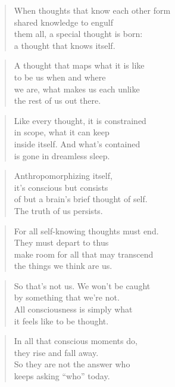 \documentclass[10pt,a4paper]{article}
\begin{document}
\begin{paracol}{2}
\begin{verse}
When thoughts that know each other form\\
shared knowledge to engulf\\
them all, a special thought is born:\\
a thought that knows itself.
\end{verse}

\begin{verse}
A thought that maps what it is like\\
to be us when and where\\
we are, what makes us each unlike\\
the rest of us out there.
\end{verse}

\begin{verse}
Like every thought, it is constrained\\
in scope, what it can keep\\
inside itself. And what’s contained\\
is gone in dreamless sleep.
\end{verse}

\begin{verse}
Anthropomorphizing itself,\\
it’s conscious but consists\\
of but a brain’s brief thought of self.\\
The truth of us persists.
\end{verse}

\begin{verse}
For all self-knowing thoughts must end.\\
They must depart to thus\\
make room for all that may transcend\\
the things we think are us.
\end{verse}

\begin{verse}
So that’s not us. We won’t be caught\\
by something that we’re not.\\
All consciousness is simply what\\
it feels like to be thought.
\end{verse}

\begin{verse}
In all that conscious moments do,\\
they rise and fall away.\\
So they are not the answer who\\
keeps asking “who” today.
\end{verse}


\end{paracol}
\end{document}
